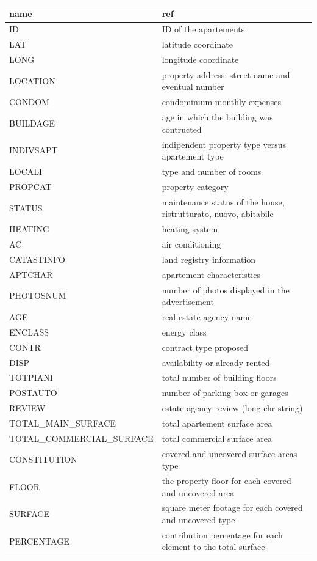 \documentclass[
  12pt,
  a4paper,
  oneside]{book}
\theoremstyle{definition}
\theoremstyle{definition}
\theoremstyle{definition}
\theoremstyle{remark}
\begin{document}
\begin{longtable}{ll}
\toprule
name & ref\\
\midrule
ID & ID of the apartements\\
LAT & latitude coordinate\\
LONG & longitude coordinate\\
LOCATION & property address: street name and eventual number\\
CONDOM & condominium monthly expenses\\
\addlinespace
BUILDAGE & age in which the building was contructed\\
INDIVSAPT & indipendent property type versus apartement type\\
LOCALI & type and number of rooms\\
PROPCAT & property category\\
STATUS & maintenance status of the house, ristrutturato, nuovo, abitabile\\
\addlinespace
HEATING & heating system\\
AC & air conditioning\\
CATASTINFO & land registry information\\
APTCHAR & apartement characteristics\\
PHOTOSNUM & number of photos displayed in the advertisement\\
\addlinespace
AGE & real estate agency name\\
ENCLASS & energy class\\
CONTR & contract type proposed\\
DISP & availability or already rented\\
TOTPIANI & total number of building floors\\
\addlinespace
POSTAUTO & number of parking box or garages\\
REVIEW & estate agency review (long chr string)\\
TOTAL\_MAIN\_SURFACE & total apartement surface area\\
TOTAL\_COMMERCIAL\_SURFACE & total commercial surface area\\
CONSTITUTION & covered and uncovered surface areas type\\
\addlinespace
FLOOR & the property floor for each covered and uncovered area\\
SURFACE & square meter footage for each covered and uncovered type\\
PERCENTAGE & contribution percentage for each element to the total surface\\

\end{longtable}
\end{document}
